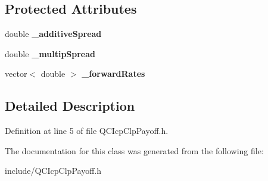 \subsection*{Protected Attributes}
\begin{DoxyCompactItemize}
\item 
\hypertarget{class_q_c_icp_clp_payoff_a5382209d1d84da225e9e5e32a2b79ca0}{double {\bfseries \+\_\+additive\+Spread}}\label{class_q_c_icp_clp_payoff_a5382209d1d84da225e9e5e32a2b79ca0}

\item 
\hypertarget{class_q_c_icp_clp_payoff_a3291226b6bff6459f8754f15229b4abf}{double {\bfseries \+\_\+multip\+Spread}}\label{class_q_c_icp_clp_payoff_a3291226b6bff6459f8754f15229b4abf}

\item 
\hypertarget{class_q_c_icp_clp_payoff_a37e674eebfd2650bcf4fead468724125}{vector$<$ double $>$ {\bfseries \+\_\+forward\+Rates}}\label{class_q_c_icp_clp_payoff_a37e674eebfd2650bcf4fead468724125}

\end{DoxyCompactItemize}


\subsection{Detailed Description}


Definition at line 5 of file Q\+C\+Icp\+Clp\+Payoff.\+h.



The documentation for this class was generated from the following file\+:\begin{DoxyCompactItemize}
\item 
include/Q\+C\+Icp\+Clp\+Payoff.\+h\end{DoxyCompactItemize}
